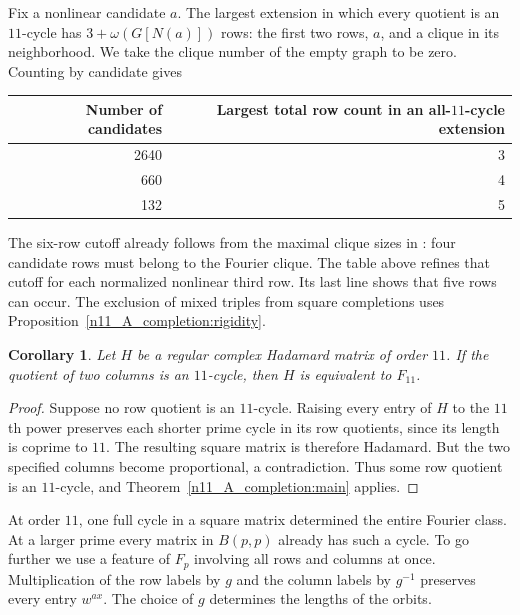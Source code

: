 \documentclass[11pt,a4paper]{article}
\newtheorem{corollary}[theorem]{Corollary}
\numberwithin{equation}{section}
\begin{document}
Fix a nonlinear candidate $a$. The largest extension in which every quotient is an $11$-cycle has $3+\omega(G[N(a)])$ rows: the first two rows, $a$, and a clique in its neighborhood. We take the clique number of the empty graph to be zero. Counting by candidate gives
\begin{samepage}
\begin{center}
\begin{tabular}{@{}rr@{}}
\toprule
Number of candidates & Largest total row count in an all-$11$-cycle extension\\
\midrule
2640 & 3\\
660 & 4\\
132 & 5\\
\bottomrule
\end{tabular}
\end{center}
\end{samepage}
The six-row cutoff already follows from the maximal clique sizes in \cite[Table~1]{lt}: four candidate rows must belong to the Fourier clique. The table above refines that cutoff for each normalized nonlinear third row. Its last line shows that five rows can occur. The exclusion of mixed triples from square completions uses Proposition~\ref{n11_A_completion:rigidity}.

\begin{corollary}\label{prime:column}
Let $H$ be a regular complex Hadamard matrix of order $11$. If the quotient of two columns is an $11$-cycle, then $H$ is equivalent to $F_{11}$.
\end{corollary}

\begin{proof}
Suppose no row quotient is an $11$-cycle. Raising every entry of $H$ to the $11$th power preserves each shorter prime cycle in its row quotients, since its length is coprime to $11$. The resulting square matrix is therefore Hadamard. But the two specified columns become proportional, a contradiction. Thus some row quotient is an $11$-cycle, and Theorem~\ref{n11_A_completion:main} applies.
\end{proof}

At order $11$, one full cycle in a square matrix determined the entire Fourier class. At a larger prime every matrix in $B(p,p)$ already has such a cycle. To go further we use a feature of $F_p$ involving all rows and columns at once. Multiplication of the row labels by $g$ and the column labels by $g^{-1}$ preserves every entry $w^{ax}$. The choice of $g$ determines the lengths of the orbits.
\end{document}
